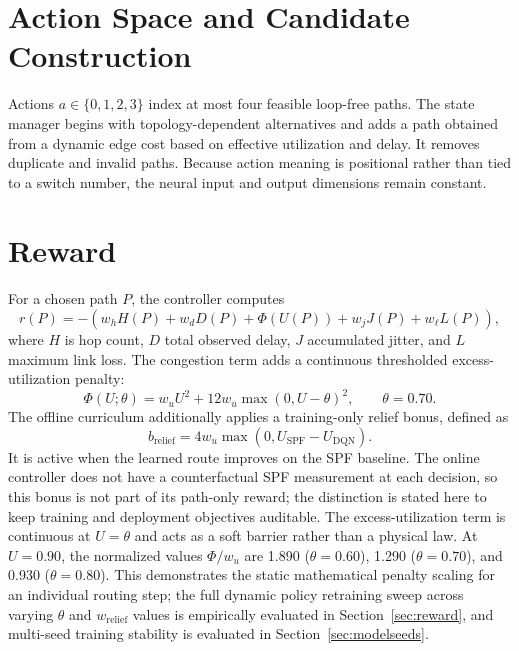 \documentclass[12pt,a4paper,oneside]{report}
\begin{document}
\section{Action Space and Candidate Construction}
Actions $a\in\{0,1,2,3\}$ index at most four feasible loop-free paths. The state manager begins with topology-dependent alternatives and adds a path obtained from a dynamic edge cost based on effective utilization and delay. It removes duplicate and invalid paths. Because action meaning is positional rather than tied to a switch number, the neural input and output dimensions remain constant.

\section{Reward}
For a chosen path $P$, the controller computes
\begin{equation}
r(P)=-\left(w_hH(P)+w_dD(P)+\Phi(U(P))+w_jJ(P)+w_\ell L(P)\right),
\label{eq:reward}
\end{equation}
where $H$ is hop count, $D$ total observed delay, $J$ accumulated jitter, and $L$ maximum link loss. The congestion term adds a continuous thresholded excess-utilization penalty:
\begin{equation}
\Phi(U;\theta)=w_uU^2+12w_u\max(0,U-\theta)^2,
\qquad \theta=0.70.
\label{eq:congestion_penalty}
\end{equation}
The offline curriculum additionally applies a training-only relief bonus,
defined as
\begin{equation}
b_{\mathrm{relief}}=4w_u\max(0,U_{\mathrm{SPF}}-U_{\mathrm{DQN}}).
\label{eq:relief_bonus}
\end{equation}
It is active when the learned route improves on the SPF baseline. The online controller does not have a counterfactual SPF
measurement at each decision, so this bonus is not part of its path-only reward;
the distinction is stated here to keep training and deployment objectives auditable.
The excess-utilization term is continuous at $U=\theta$ and acts as a soft
barrier rather than a physical law. At $U=0.90$, the normalized values
$\Phi/w_u$ are 1.890 ($\theta=0.60$), 1.290 ($\theta=0.70$), and 0.930
($\theta=0.80$). This demonstrates the static mathematical penalty scaling for an individual routing step; the full dynamic policy retraining sweep across varying $\theta$ and $w_{\mathrm{relief}}$ values is empirically evaluated in Section~\ref{sec:reward}, and multi-seed training stability is evaluated in Section~\ref{sec:modelseeds}.
\end{document}
